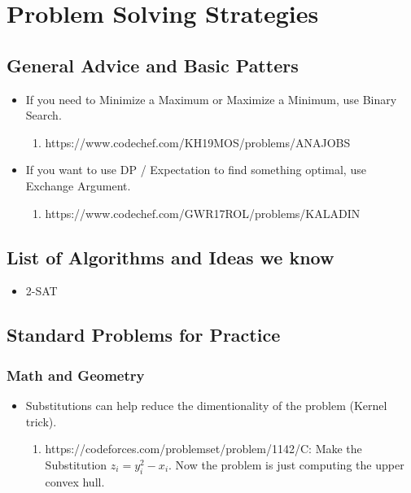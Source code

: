 \chapter{Problem Solving Strategies}


\section{General Advice and Basic Patters}

\begin{itemize}
    \item If you need to Minimize a Maximum or Maximize a Minimum, use Binary Search.
    \begin{enumerate}
        \item https://www.codechef.com/KH19MOS/problems/ANAJOBS
    \end{enumerate}
    \item If you want to use DP / Expectation to find something optimal, use Exchange Argument.
    \begin{enumerate}
        \item https://www.codechef.com/GWR17ROL/problems/KALADIN
    \end{enumerate}
\end{itemize}

\section{List of Algorithms and Ideas we know}

\begin{itemize}
    \item 2-SAT
\end{itemize}

\section{Standard Problems for Practice}

\subsection{Math and Geometry}

\begin{itemize}
    \item Substitutions can help reduce the dimentionality of the problem (Kernel trick).
    \begin{enumerate}
        \item https://codeforces.com/problemset/problem/1142/C: Make the Substitution $z_{i} = y_{i}^{2} - x_{i}$. Now the problem is just computing the upper convex hull.
    \end{enumerate}
\end{itemize}


